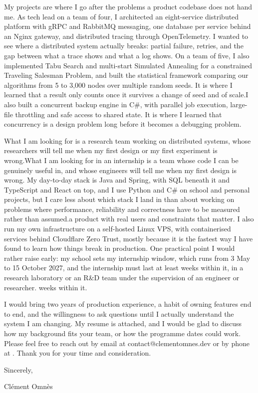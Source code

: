 \documentclass[a4paper,11pt]{article}
\begin{document}
\textcolor{colorBody}{My projects are where I go after the problems a product codebase does not hand me. As tech lead on a team of four, I architected an eight-service distributed platform with gRPC and RabbitMQ messaging, one database per service behind an Nginx gateway, and distributed tracing through OpenTelemetry. I wanted to see where a distributed system actually breaks: partial failure, retries, and the gap between what a trace shows and what a log shows. \ifdefined\researchVariant On a team of five, I also implemented Tabu Search and multi-start Simulated Annealing for a constrained Traveling Salesman Problem, and built the statistical framework comparing our algorithms from 5 to 3,000 nodes over multiple random seeds. It is where I learned that a result only counts once it survives a change of seed and of scale.\else I also built a concurrent backup engine in C\#, with parallel job execution, large-file throttling and safe access to shared state. It is where I learned that concurrency is a design problem long before it becomes a debugging problem.\fi}

\textcolor{colorBody}{\ifdefined\researchVariant What I am looking for is a research team working on distributed systems, whose researchers will tell me when my first design or my first experiment is wrong.\else What I am looking for in an internship is a team whose code I can be genuinely useful in, and whose engineers will tell me when my first design is wrong.\fi{} My day-to-day stack is Java and Spring, with SQL beneath it and TypeScript and React on top, and I use Python and C\# on school and personal projects, but I care less about which stack I land in than about working on \ifdefined\researchVariant problems where performance, reliability and correctness have to be measured rather than assumed.\else a product with real users and constraints that matter.\fi{} \ifdefined\researchVariant\else I also run my own infrastructure on a self-hosted Linux VPS, with containerised services behind Cloudflare Zero Trust, mostly because it is the fastest way I have found to learn how things break in production. \fi{}One practical point I would rather raise early: my school sets my internship window, which runs from 3 May to 15 October 2027, and the internship must last at least \ifdefined{} weeks within it, in a research laboratory or an R\&D team under the supervision of an engineer or researcher. weeks within it.\fi}

\textcolor{colorBody}{I would bring two years of production experience, a habit of owning features end to end, and the willingness to ask questions until I actually understand the system I am changing. My resume is attached, and I would be glad to discuss how my background fits your team, or how the programme dates could work. Please feel free to reach out by email at contact@clementomnes.dev or by phone at \resumePhone. Thank you for your time and consideration.}

\vspace{0.5em}

\noindent\textcolor{colorBody}{Sincerely,}

\noindent\textcolor{colorBody}{Clément Omnès}
\end{document}
